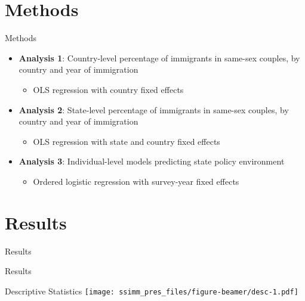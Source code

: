 \documentclass[
  ignorenonframetext,
]{beamer}
\providecommand{\tightlist}{%
  \setlength{\itemsep}{0pt}\setlength{\parskip}{0pt}}
\begin{document}
\hypertarget{methods}{%
\section{Methods}\label{methods}}

\begin{frame}{Methods}
\protect\hypertarget{methods-1}{}
\begin{itemize}
\tightlist
\item
  \textbf{Analysis 1}: Country-level percentage of immigrants in
  same-sex couples, by country and year of immigration

  \begin{itemize}
  \tightlist
  \item
    OLS regression with country fixed effects
  \end{itemize}
\item
  \textbf{Analysis 2}: State-level percentage of immigrants in same-sex
  couples, by country and year of immigration

  \begin{itemize}
  \tightlist
  \item
    OLS regression with state and country fixed effects
  \end{itemize}
\item
  \textbf{Analysis 3}: Individual-level models predicting state policy
  environment

  \begin{itemize}
  \tightlist
  \item
    Ordered logistic regression with survey-year fixed effects
  \end{itemize}
\end{itemize}
\end{frame}

\hypertarget{results}{%
\section{Results}\label{results}}

\begin{frame}{Results}
\protect\hypertarget{results-1}{}
\begin{center}
  \huge{\textcolor{uclablue}{Results}}
\end{center}
\end{frame}

\begin{frame}{Descriptive Statistics}
\protect\hypertarget{descriptive-statistics}{}
\texttt{[image: ssimm\_pres\_files/figure-beamer/desc-1.pdf]}
\end{frame}
\end{document}
